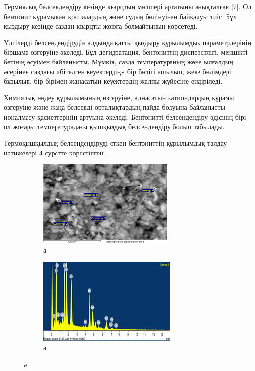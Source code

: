 Термиялық белсендендіру кезінде кварцтың мөлшері артатыны анықталған
{[}7{]}. Ол бентонит құрамынан қоспалардың және судың бөлінуінен
байқалуы тиіс. Бұл қыздыру кезінде саздан кварцты жоюға болмайтынын
көрсетеді.

Үлгілерді белсендендірудің алдында қатты қыздыру құрылымдық
параметрлерінің біршама өзгеруіне әкеледі. Бұл дегидратация, бентониттің
дисперстлігі, меншікті бетінің өсуімен байланысты. Мүмкін, сазда
температураның және ылғалдың әсерінен саздағы «бітелген кеуектердің» бір
бөлігі ашылып, жеке бөлімдері бұзылып, бір-бірімен жанасатын кеуектердің
жалпы жүйесіне ендіріледі.

Химиялық өңдеу құрылымының өзгеруіне, алмасатын катиондардың құрамы
өзгеруіне және жаңа белсенді орталықтардың пайда болуына байланысты
ионалмасу қасиеттерінің артуына әкеледі. Бентонитті белсендендіру
әдісінің бірі ол жоғары температурадағы қышқылдық белсендендіру болып
табылады.

Термоқышқылдық белсендендіруді өткен бентониттің құрылымдық талдау
нәтижелері 4-суретте көрсетілген.

\begin{figure}[H]
    \centering
    \begin{subfigure}[b]{0.45\textwidth}
        \centering
        \includegraphics[width=\textwidth]{assets/1046}
        \caption*{а}
    \end{subfigure}
    \hfill
    \begin{subfigure}[b]{0.45\textwidth}
        \centering
        \includegraphics[width=\textwidth]{assets/1046.1}
        \caption*{ә}
    \end{subfigure}
\end{figure}

